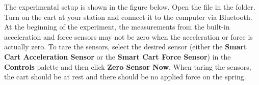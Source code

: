 The experimental setup is shown in the figure below.
Open the file  in the \filename{\coursefolder} folder. Turn on the cart at your station and connect it to the computer via Bluetooth. At the beginning of the experiment, the measurements from the built-in acceleration and force sensors may not be zero when the acceleration or force is actually zero. To tare the sensors, select the desired sensor (either the \textbf{Smart Cart Acceleration Sensor} or the \textbf{Smart Cart Force Sensor}) in the \textbf{Controls} palette and then click \textbf{Zero Sensor Now}. When taring the sensors, the cart should be at rest and there should be no applied force on the spring. 
 

\vspace{0.3cm}
{\par\centering {} \par}
\vspace{0.3cm}

